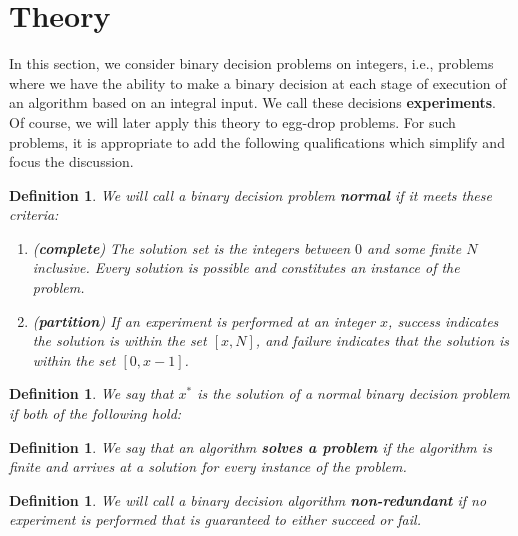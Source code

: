 \documentclass[12pt]{amsart}
\newtheorem{definition}[theorem]{Definition}
\theoremstyle{definition}
\theoremstyle{theorem}
\begin{document}
\section{Theory}

In this section, we consider binary decision problems on integers, i.e., problems where we have the ability to make a binary decision at each stage of execution of an algorithm based on an integral input. We call these decisions {\bf experiments}. Of course, we will later apply this theory to egg-drop problems.
For such problems, it is appropriate to add the following qualifications which simplify and focus 
the discussion.

\begin{definition}\label{def.normal}
	We will call a binary decision problem \textbf{normal} if it meets these criteria:
	\begin{enumerate}
	\item (\textbf{complete}) The solution set is the integers between $0$ and some finite $N$ inclusive. Every solution is possible and constitutes an instance of the problem.
	\item (\textbf{partition}) If an experiment is performed at an integer $x$, success indicates the solution is within the set $[x,N]$, and failure indicates that the solution is within the set $[0,x-1]$. 	
	\end{enumerate}

\end{definition}


\begin{definition} \label{solution}
	We say that $x^{*}$ is the solution of a normal binary decision problem if both of the following hold:
\end{definition}

\begin{definition}
We say that an algorithm \textbf{solves a problem} if the algorithm is finite and arrives at a solution for every instance of the problem.
\end{definition}

\begin{definition}\label{def.non.redundant}
	We will call a binary decision algorithm \textbf{non-redundant} if no experiment is performed that is guaranteed to either succeed or fail.
\end{definition}
\end{document}
